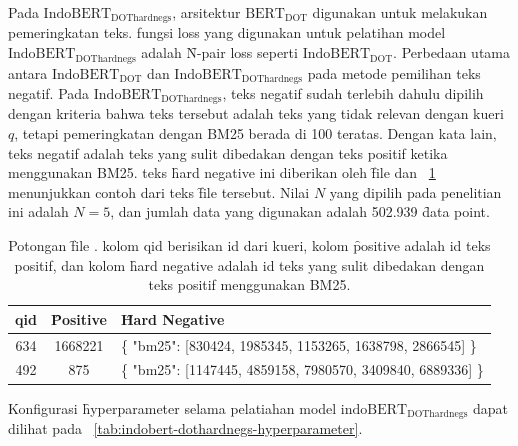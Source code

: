 Pada $\text{IndoBERT}_\text{DOThardnegs}$, arsitektur $\text{BERT}_\text{DOT}$ digunakan untuk melakukan pemeringkatan teks. fungsi loss yang digunakan untuk pelatihan model $\text{IndoBERT}_{\text{DOThardnegs}}$ adalah \f{N-pair loss} seperti $\text{IndoBERT}_{\text{DOT}}$. Perbedaan utama antara $\text{IndoBERT}_{\text{DOT}}$ dan $\text{IndoBERT}_{\text{DOThardnegs}}$ pada metode pemilihan teks negatif. Pada $\text{IndoBERT}_{\text{DOThardnegs}}$, teks negatif sudah terlebih dahulu dipilih dengan kriteria bahwa teks tersebut adalah teks yang tidak relevan dengan kueri $q$, tetapi pemeringkatan dengan BM25 berada di 100 teratas. Dengan kata lain, teks negatif adalah teks yang sulit dibedakan dengan teks positif ketika menggunakan BM25. teks \f{hard negative} ini diberikan oleh \f{file} dan \tab~\ref{tab:hardnegsbm25} menunjukkan contoh dari teks \f{file} tersebut. Nilai $N$ yang dipilih pada penelitian ini adalah $N=5$, dan jumlah data yang digunakan adalah 502.939 \f{data point}.
\begin{table}[!ht]
    \centering
    \caption{Potongan \f{file} . kolom qid berisikan id dari kueri, kolom \f{positive} adalah id teks positif, dan kolom \f{hard negative} adalah id teks yang sulit dibedakan dengan teks positif menggunakan BM25.}
    \label{tab:hardnegsbm25}
    \begin{tabular}{|c|c|p{8cm}|}
        \hline
        qid & \f{Positive} & \f{Hard Negative}                                           \\
        \hline
        634 & 1668221      & \{ "bm25": [830424, 1985345, 1153265, 1638798, 2866545] \}  \\
        \hline
        492 & 875          & \{ "bm25": [1147445, 4859158, 7980570, 3409840, 6889336] \} \\
        \hline
    \end{tabular}
\end{table}

Konfigurasi \f{hyperparameter} selama pelatiahan model $\text{indoBERT}_{\text{DOThardnegs}}$ dapat  dilihat pada \tab~\ref{tab:indobert-dothardnegs-hyperparameter}.

